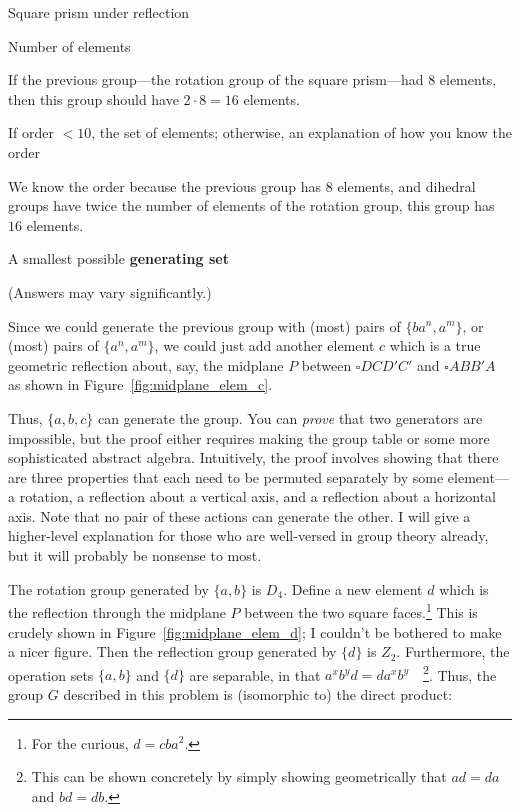 \documentclass[../key.tex]{subfiles}
\begin{document}
\begin{outer_problem}
\item Square prism under reflection
\end{outer_problem}

\begin{inner_problem}[start=1]
\item Number of elements
\end{inner_problem}

\noindent If the previous group---the rotation group of the square prism---had $8$ elements, then this group should have $2\cdot 8 = 16$ elements.

\begin{inner_problem}
\item If order $< 10$, the set of elements; otherwise, an explanation of how you know the order
\end{inner_problem}

\noindent We know the order because the previous group has $8$ elements, and dihedral groups have twice the number of elements of the rotation group, this group has $16$ elements.

\begin{inner_problem}
\item A smallest possible \textbf{generating set}
\end{inner_problem}

\noindent(Answers may vary significantly.)

Since we could generate the previous group with (most) pairs of $\{ba^n,a^m\}$, or (most) pairs of $\{a^n,a^m\}$, we could just add another element $c$ which is a true geometric reflection about, say, the midplane $P$ between $\square DCD'C'$ and $\square ABB'A$ as shown in Figure~\ref{fig:midplane_elem_c}.

Thus, $\{a,b,c\}$ can generate the group. You can \textit{prove} that two generators are impossible, but the proof either requires making the group table or some more sophisticated abstract algebra. Intuitively, the proof involves showing that there are three properties that each need to be permuted separately by some element---a rotation, a reflection about a vertical axis, and a reflection about a horizontal axis. Note that no pair of these actions can generate the other. I will give a higher-level explanation for those who are well-versed in group theory already, but it will probably be nonsense to most. 

The rotation group generated by $\{a,b\}$ is $D_4$. Define a new element $d$ which is the reflection through the midplane $P$ between the two square faces.\footnote{For the curious, $d=cba^2$.} This is crudely shown in Figure~\ref{fig:midplane_elem_d}; I couldn't be bothered to make a nicer figure. Then the reflection group generated by $\{d\}$ is $Z_2$. Furthermore, the operation sets $\{a,b\}$ and $\{d\}$ are separable, in that $a^xb^yd=da^xb^y\quad$\footnote{This can be shown concretely by simply showing geometrically that $ad=da$ and $bd=db$.}. Thus, the group $G$ described in this problem is (isomorphic to) the direct product:
\end{document}
